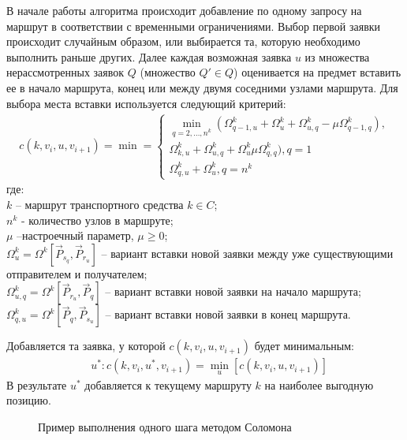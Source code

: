 \documentclass[]{TAACpaper}
\begin{document}
В начале работы алгоритма происходит добавление по одному запросу на маршрут в соответствии с временными ограничениями. Выбор первой заявки происходит случайным образом, или выбирается та, которую необходимо выполнить раньше других. Далее каждая возможная заявка  $u$ из множества нерассмотренных заявок $Q$ (множество $Q' \in Q$) оценивается на предмет вставить ее в начало маршрута, конец или между двумя соседними узлами маршрута. Для выбора места вставки используется следующий критерий:
\begin{align} 
	\label{insert_kr}
	c(k,v_i,u,v_{i+1}) = \min =
	\begin{cases}
		\min_{q=2,\dots,n^k}(\Omega_{q-1,u}^k+\Omega_{u}^{k}+\Omega_{u,q}^{k}-\mu \Omega_{q-1,q}^k),\\
		\Omega_{k,u}^k+\Omega_{u,q}^k+\Omega_{u}^k\mu \Omega_{q,q}^k), q=1\\
		\Omega_{q,u}^k+\Omega_{u}^k, q=n^k
	\end{cases}
\end{align} 
где:\\
$k$ -- маршрут транспортного средства $k\in C$;\\
$n^k$ - количество узлов в маршруте;\\
$\mu$ --настроечный параметр, $\mu \ge 0 $;\\
$\Omega_{u}^k=\Omega^k[\vec{P}_{s_q}, \vec{P}_{r_u}]$ -- вариант вставки новой заявки между уже существующими отправителем и получателем;\\
$\Omega_{u,q}^k=\Omega^k[\vec{P}_{r_u}, \vec{P}_{q}]$ -- вариант вставки новой заявки на начало маршрута;\\
$\Omega_{q,u}^k=\Omega^k[\vec{P}_{q}, \vec{P}_{s_u}]$ -- вариант вставки новой заявки в конец маршрута.

Добавляется та заявка, у которой $c(k,v_i,u,v_{i+1})$ будет минимальным:
\begin{align} 
	\label{kriterij}
	& u^*:c(k,v_i,u^*,v_{i+1})=\min_{u}[c(k,v_i,u,v_{i+1})]
\end{align} 
В результате $u^*$ добавляется к текущему маршруту $k$ на наиболее выгодную позицию.
\begin{figure}[h]
	\caption{Пример выполнения одного шага методом Соломона}
	\label{ris:pict1}
\end{figure}
\end{document}
